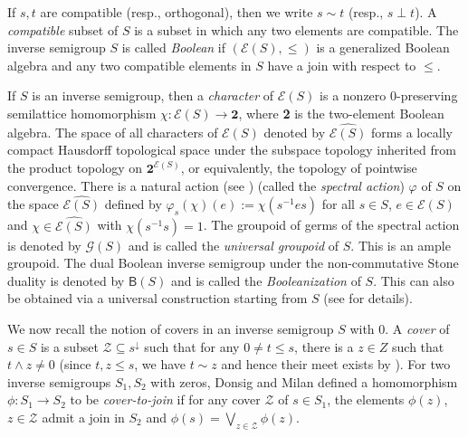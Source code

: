\documentclass[a4paper,reqno,11pt]{amsart}
\numberwithin{equation}{section}
\theoremstyle{definition}
\theoremstyle{remark}
\begin{document}
If $s,t$ are compatible (resp., orthogonal), then we write $s\sim t$ (resp., $s\perp t$). A \emph{compatible} subset of $S$ is a subset in which any two elements are compatible. The inverse semigroup $S$ is called \emph{Boolean} \cite{LawBool} if $(\mathcal{E}(S),\le)$ is a generalized Boolean algebra and any two compatible elements in $S$ have a join with respect to $\le$.

If $S$ is an inverse semigroup, then a \emph{character} of $\mathcal{E}(S)$ is a nonzero $0$-preserving semilattice homomorphism $\chi:\mathcal{E}(S)\longrightarrow \textbf{2}$, where \textbf{2} is the two-element Boolean algebra. The space of all characters of $\mathcal{E}(S)$ denoted by $\widehat{\mathcal{E}(S)}$ forms a locally compact Hausdorff topological space under the subspace topology inherited from the product topology on $\textbf{2}^{\mathcal{E}(S)}$, or equivalently, the topology of pointwise convergence. There is a natural action (see \cite{Exel}) (called the \emph{spectral action}) $\varphi$ of $S$ on the space $\widehat{\mathcal{E}(S)}$ defined by $\varphi_s(\chi)(e):=\chi(s^{-1}e s)$ for all $s\in S$, $e\in \mathcal{E}(S)$ and $\chi\in \widehat{\mathcal{E}(S)}$ with $\chi(s^{-1}s)=1$. The groupoid of germs \cite[Proposition 4.17]{Exel} of the spectral action is denoted by $\mathcal{G}(S)$ and is called the \emph{universal groupoid} of $S$. This is an ample groupoid. The dual Boolean inverse semigroup under the non-commutative Stone duality \cite{LawNC} is denoted by $\mathsf{B}(S)$ and is called the \emph{Booleanization} of $S$. This can also be obtained via a universal construction starting from $S$ (see \cite{LawBool} for details). 

We now recall the notion of covers in an inverse semigroup $S$ with $0$. A \emph{cover} of $s\in S$ is a subset $\mathcal{Z}\subseteq s^{\downarrow}$ such that for any $0\neq t\le s$, there is a $z\in Z$ such that $t\wedge z\neq 0$ (since $t,z\le s$, we have $t\sim z$ and hence their meet exists by \cite[Lemma 1.4.11]{Lawson}). For two inverse semigroups $S_1,S_2$ with zeros, Donsig and Milan \cite{Milan} defined a homomorphism $\phi:S_1\longrightarrow S_2$ to be \emph{cover-to-join} if for any cover $\mathcal{Z}$ of $s\in S_1$, the elements $\phi(z)$, $z\in \mathcal{Z}$ admit a join in $S_2$ and $\phi(s)=\displaystyle{\bigvee_{z\in \mathcal{Z}}}\phi(z)$. 
\end{document}
